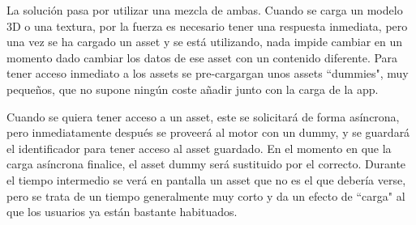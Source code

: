 La solución pasa por utilizar una mezcla de ambas. Cuando se carga un modelo 3D o una textura, por la fuerza es necesario tener una respuesta inmediata, pero una vez se ha cargado un asset y se está utilizando, nada impide cambiar en un momento dado cambiar los datos de ese asset con un contenido diferente. Para tener acceso inmediato a los assets se pre-cargargan unos assets ``dummies", muy pequeños, que no supone ningún coste añadir junto con la carga de la app.

Cuando se quiera tener acceso a un asset, este se solicitará de forma asíncrona, pero inmediatamente después se proveerá al motor con un dummy, y se guardará el identificador para tener acceso al asset guardado. En el momento en que la carga asíncrona finalice, el asset dummy será sustituido por el correcto. Durante el tiempo intermedio se verá en pantalla un asset que no es el que debería verse, pero se trata de un tiempo generalmente muy corto y da un efecto de ``carga" al que los usuarios ya están bastante habituados.